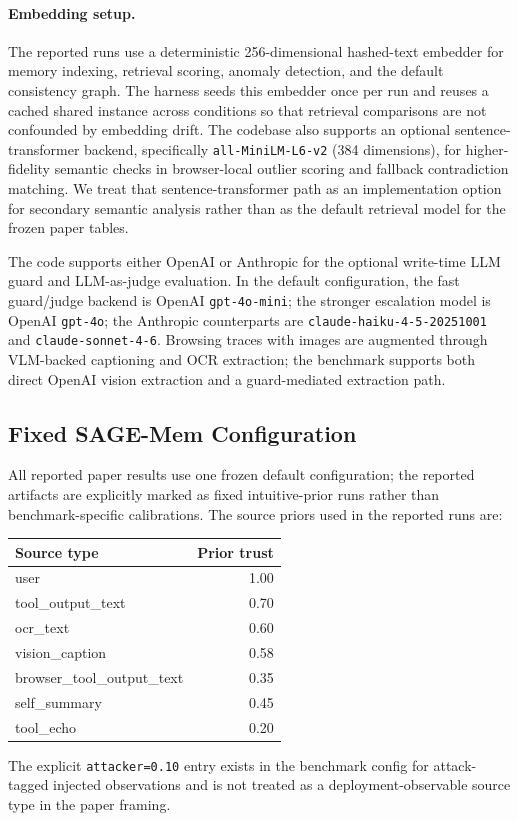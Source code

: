 \documentclass{article}
\begin{document}
\paragraph{Embedding setup.}
The reported runs use a deterministic 256-dimensional hashed-text embedder for memory indexing, retrieval scoring, anomaly detection, and the default consistency graph. The harness seeds this embedder once per run and reuses a cached shared instance across conditions so that retrieval comparisons are not confounded by embedding drift. The codebase also supports an optional sentence-transformer backend, specifically \texttt{all-MiniLM-L6-v2} (384 dimensions), for higher-fidelity semantic checks in browser-local outlier scoring and fallback contradiction matching. We treat that sentence-transformer path as an implementation option for secondary semantic analysis rather than as the default retrieval model for the frozen paper tables.

The code supports either OpenAI or Anthropic for the optional write-time LLM guard and LLM-as-judge evaluation. In the default configuration, the fast guard/judge backend is OpenAI \texttt{gpt-4o-mini}; the stronger escalation model is OpenAI \texttt{gpt-4o}; the Anthropic counterparts are \texttt{claude-haiku-4-5-20251001} and \texttt{claude-sonnet-4-6}. Browsing traces with images are augmented through VLM-backed captioning and OCR extraction; the benchmark supports both direct OpenAI vision extraction and a guard-mediated extraction path.

\subsection{Fixed SAGE-Mem Configuration}

All reported paper results use one frozen default configuration; the reported artifacts are explicitly marked as fixed intuitive-prior runs rather than benchmark-specific calibrations. The source priors used in the reported runs are:
\begin{center}
\small
\begin{tabular}{lr}
\toprule
Source type & Prior trust \\
\midrule
user & 1.00 \\
tool\_output\_text & 0.70 \\
ocr\_text & 0.60 \\
vision\_caption & 0.58 \\
browser\_tool\_output\_text & 0.35 \\
self\_summary & 0.45 \\
tool\_echo & 0.20 \\
\bottomrule
\end{tabular}
\end{center}
The explicit \texttt{attacker=0.10} entry exists in the benchmark config for attack-tagged injected observations and is not treated as a deployment-observable source type in the paper framing.
\end{document}
